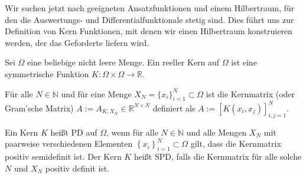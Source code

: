 Wir suchen jetzt nach geeigneten Ansatzfunktionen und einem Hilbertraum, für den die Auswertungs- und Differentialfunktionale stetig sind. Dies führt uns zur Definition von Kern Funktionen, mit denen wir einen Hilbertraum konstruieren werden, der das Geforderte liefern wird.

\begin{definition}[Kern]
\label{Kern}
Sei $\Omega$ eine beliebige nicht leere Menge. Ein reeller Kern auf $\Omega$ ist eine symmetrische Funktion $K: \Omega \times \Omega \rightarrow \mathbb{R}$.

Für alle $N \in \mathbb{N}$ und für eine Menge $X_N = \{x_i\}_{i=1}^N \subset \Omega$ ist die Kernmatrix (oder Gram'sche Matrix) $A:= A_{K,X_N} \in \mathbb{R}^{N \times N}$  definiert als $A:=[K(x_i, x_j)]_{i,j=1}^N$.

Ein Kern $K$ heißt \ac{PD} auf $\Omega$, wenn für alle $N \in \mathbb{N}$ und alle Mengen $X_N$ mit paarweise verschiedenen Elementen $\left\{x_i\right\}_{i=1}^N \subset \Omega$ gilt, dass die Kernmatrix positiv semidefinit ist. Der Kern $K$ heißt \ac{SPD}, falls die Kernmatrix für alle solche $N$ und $X_N$ positiv definit ist.
\end{definition}

